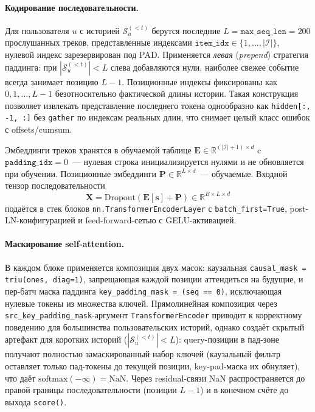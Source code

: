 \paragraph{Кодирование последовательности.} Для пользователя $u$ с историей $\mathcal{S}_u^{(<t)}$ берутся последние $L = \mathtt{max\_seq\_len} = 200$ прослушанных треков, представленные индексами $\mathtt{item\_idx} \in \{1, \ldots, |\mathcal{I}|\}$, нулевой индекс зарезервирован под PAD. Применяется \emph{левая} (\emph{prepend}) стратегия паддинга: при $|\mathcal{S}_u^{(<t)}| < L$ слева добавляются нули, наиболее свежее событие всегда занимает позицию $L - 1$. Позиционные индексы фиксированы как $0, 1, \ldots, L - 1$ безотносительно фактической длины истории. Такая конструкция позволяет извлекать представление последнего токена однообразно как \texttt{hidden[:, -1, :]} без \texttt{gather} по индексам реальных длин, что снимает целый класс ошибок с offsets/cumsum.

Эмбеддинги треков хранятся в обучаемой таблице $\mathbf{E} \in \mathbb{R}^{(|\mathcal{I}|+1) \times d}$ c $\mathtt{padding\_idx}=0$~--- нулевая строка инициализируется нулями и не обновляется при обучении. Позиционные эмбеддинги $\mathbf{P} \in \mathbb{R}^{L \times d}$~--- обучаемые. Входной тензор последовательности
\begin{equation*}
    \mathbf{X} = \mathrm{Dropout}\!\left( \mathbf{E}[\mathbf{s}] + \mathbf{P} \right) \in \mathbb{R}^{B \times L \times d}
\end{equation*}
подаётся в стек блоков \texttt{nn.TransformerEncoderLayer} с \texttt{batch\_first=True}, post-LN-конфигурацией и feed-forward-сетью с GELU-активацией.

\paragraph{Маскирование self-attention.} В каждом блоке применяется композиция двух масок: каузальная \texttt{causal\_mask = triu(ones, diag=1)}, запрещающая каждой позиции аттендиться на будущие, и пер-батч маска паддинга \texttt{key\_padding\_mask = (seq == 0)}, исключающая нулевые токены из множества ключей. Прямолинейная композиция через \texttt{src\_key\_padding\_mask}-аргумент \texttt{TransformerEncoder} приводит к корректному поведению для большинства пользовательских историй, однако создаёт скрытый артефакт для коротких историй ($|\mathcal{S}_u^{(<t)}| < L$): query-позиции в пад-зоне получают полностью замаскированный набор ключей (каузальный фильтр оставляет только пад-токены до текущей позиции, key-pad-маска их обнуляет), что даёт $\mathrm{softmax}(-\infty) = \mathrm{NaN}$. Через residual-связи NaN распространяется до правой границы последовательности (позиции $L-1$) и в конечном счёте до выхода \texttt{score()}.

